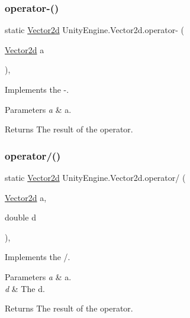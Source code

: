 \subsubsection{\texorpdfstring{operator-\/()}{operator-()}\hspace{0.1cm}{\footnotesize\ttfamily [2/2]}}
{\footnotesize\ttfamily static \hyperlink{struct_unity_engine_1_1_vector2d}{Vector2d} Unity\+Engine.\+Vector2d.\+operator-\/ (\begin{DoxyParamCaption}\item[{\hyperlink{struct_unity_engine_1_1_vector2d}{Vector2d}}]{a }\end{DoxyParamCaption})\hspace{0.3cm}{\ttfamily [inline]}, {\ttfamily [static]}}



Implements the -\/. 


\begin{DoxyParams}{Parameters}
{\em a} & a.\\
\hline
\end{DoxyParams}
\begin{DoxyReturn}{Returns}
The result of the operator.
\end{DoxyReturn}
\mbox{\label{struct_unity_engine_1_1_vector2d_a58cd30f3af06aea76058807d9fb22744}} 
\subsubsection{\texorpdfstring{operator/()}{operator/()}}
{\footnotesize\ttfamily static \hyperlink{struct_unity_engine_1_1_vector2d}{Vector2d} Unity\+Engine.\+Vector2d.\+operator/ (\begin{DoxyParamCaption}\item[{\hyperlink{struct_unity_engine_1_1_vector2d}{Vector2d}}]{a,  }\item[{double}]{d }\end{DoxyParamCaption})\hspace{0.3cm}{\ttfamily [inline]}, {\ttfamily [static]}}



Implements the /. 


\begin{DoxyParams}{Parameters}
{\em a} & a.\\
\hline
{\em d} & The d.\\
\hline
\end{DoxyParams}
\begin{DoxyReturn}{Returns}
The result of the operator.
\end{DoxyReturn}
\mbox{\label{struct_unity_engine_1_1_vector2d_a72dd725398e776616eeed4d03fe41ad2}} 
